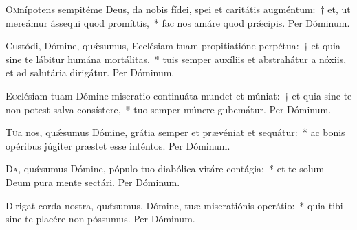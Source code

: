\documentclass[vesperale_romanum.tex]{subfiles}
\begin{document}
\oratio

\lettrine{O}{m}nípotens sempitéme Deus, da nobis fídei, spei et caritátis augméntum:~† et, ut mereámur ássequi quod promíttis,~* fac nos amáre quod prǽcipis. Per Dóminum.



\oratio

\lettrine{C}{u}stódi, Dómine, quǽsumus, Ecclésiam tuam propitiatióne perpétua:~† et quia sine te lábitur humána mortálitas,~* tuis semper auxíliis et abstrahátur a nóxiis, et ad salutária dirigátur. Per Dóminum. 



\oratio

\lettrine{E}{c}clésiam tuam Dómine miseratio continuáta mundet et múniat:~† et quia sine te non potest salva consístere,~* tuo semper múnere gubemátur. Per Dóminum.



\oratio

\lettrine{T}{u}a nos, quǽsumus Dómine, grátia semper et prævéniat et sequátur:~* ac bonis opéribus júgiter præstet esse inténtos.
Per Dóminum.


\oratio

\lettrine{D}{a}, quǽsumus Dómine, pópulo tuo diabólica vitáre contágia:~* et te solum Deum pura mente sectári. Per Dóminum.



\oratio

\lettrine{D}{i}rigat corda nostra, quǽsumus, Dómine, tuæ miseratiónis operátio:~* quia tibi sine te placére non póssumus. Per Dóminum.



\oratio
\end{document}
